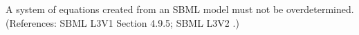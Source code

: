 A system of equations created from an SBML model must not be
overdetermined.  (References: SBML L3V1 Section 4.9.5; SBML L3V2 .)
